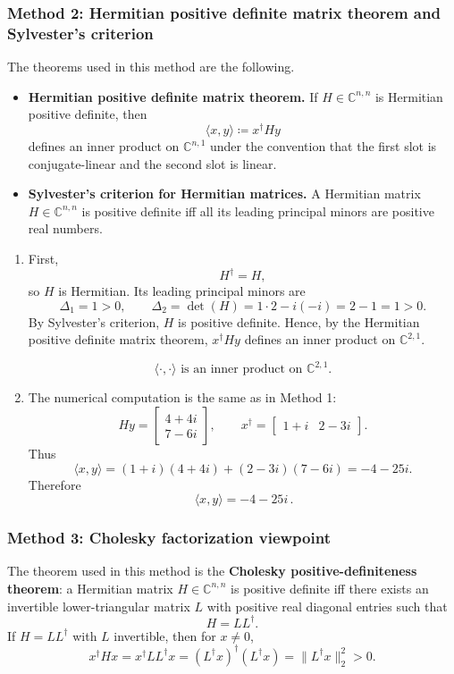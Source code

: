 \documentclass[12pt]{article}
\newcommand{\df}{\coloneqq}
\newcommand{\C}{\mathbb{C}}
\begin{document}
\newpage
\subsubsection{Method 2: Hermitian positive definite matrix theorem and Sylvester's criterion}
The theorems used in this method are the following.
\begin{itemize}[leftmargin=*]
  \item \textbf{Hermitian positive definite matrix theorem.} If $H\in\C^{n,n}$ is Hermitian positive definite, then
  \[
  \langle x,y\rangle\df x^\dagger Hy
  \]
  defines an inner product on $\C^{n,1}$ under the convention that the first slot is conjugate-linear and the second slot is linear.
  \item \textbf{Sylvester's criterion for Hermitian matrices.} A Hermitian matrix $H\in\C^{n,n}$ is positive definite iff all its leading principal minors are positive real numbers.
\end{itemize}

\begin{enumerate}[label=(\alph*)]
\item First,
\[
H^\dagger=H,
\]
so $H$ is Hermitian. Its leading principal minors are
\[
\Delta_1=1>0,
\qquad
\Delta_2=\det(H)=1\cdot 2-i(-i)=2-1=1>0.
\]
By Sylvester's criterion, $H$ is positive definite. Hence, by the Hermitian positive definite matrix theorem, $x^\dagger Hy$ defines an inner product on $\C^{2,1}$.

\[
\boxed{\,\langle\cdot,\cdot\rangle \text{ is an inner product on }\C^{2,1}.\,}
\]

\item The numerical computation is the same as in Method 1:
\[
Hy=\begin{bmatrix}4+4i\\7-6i\end{bmatrix},
\qquad
x^\dagger=\begin{bmatrix}1+i&2-3i\end{bmatrix}.
\]
Thus
\[
\langle x,y\rangle=(1+i)(4+4i)+(2-3i)(7-6i)=-4-25i.
\]
Therefore
\[
\boxed{\,\langle x,y\rangle=-4-25i\,}.
\]
\end{enumerate}

\newpage
\subsubsection{Method 3: Cholesky factorization viewpoint}
The theorem used in this method is the \textbf{Cholesky positive-definiteness theorem}: a Hermitian matrix $H\in\C^{n,n}$ is positive definite iff there exists an invertible lower-triangular matrix $L$ with positive real diagonal entries such that
\[
H=LL^\dagger.
\]
If $H=LL^\dagger$ with $L$ invertible, then for $x\neq 0$,
\[
x^\dagger Hx=x^\dagger LL^\dagger x=(L^\dagger x)^\dagger(L^\dagger x)=\|L^\dagger x\|_2^2>0.
\]
\end{document}
